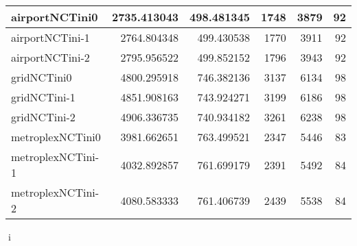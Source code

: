 \begin{longtable}{|l|r|r|r|r|r|}
airportNCTini0 & 2735.413043 & 498.481345 & 1748 & 3879 & 92 \\ \hline
airportNCTini-1 & 2764.804348 & 499.430538 & 1770 & 3911 & 92 \\ \hline
airportNCTini-2 & 2795.956522 & 499.852152 & 1796 & 3943 & 92 \\ \hline
gridNCTini0 & 4800.295918 & 746.382136 & 3137 & 6134 & 98 \\ \hline
gridNCTini-1 & 4851.908163 & 743.924271 & 3199 & 6186 & 98 \\ \hline
gridNCTini-2 & 4906.336735 & 740.934182 & 3261 & 6238 & 98 \\ \hline
metroplexNCTini0 & 3981.662651 & 763.499521 & 2347 & 5446 & 83 \\ \hline
metroplexNCTini-1 & 4032.892857 & 761.699179 & 2391 & 5492 & 84 \\ \hline
metroplexNCTini-2 & 4080.583333 & 761.406739 & 2439 & 5538 & 84 \\ \hline
\end{longtable}
i
